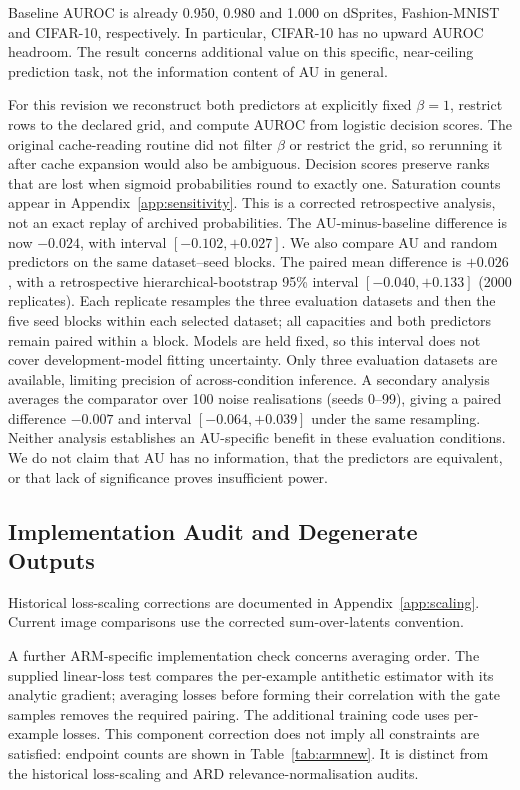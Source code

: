 \documentclass[make,article,submit,pdftex,moreauthors]{Definitions/mdpi}
\begin{document}
Baseline AUROC is already 0.950, 0.980 and 1.000 on dSprites,
Fashion-MNIST and CIFAR-10, respectively. In particular, CIFAR-10 has
no upward AUROC headroom. The result concerns additional value on this
specific, near-ceiling prediction task, not the information content of
AU in general.

For this revision we reconstruct both predictors at explicitly fixed
$\beta=1$, restrict rows to the declared grid, and compute AUROC from
logistic decision scores. The original cache-reading routine did not
filter $\beta$ or restrict the grid, so rerunning it after cache expansion
would also be ambiguous. Decision scores preserve ranks that are lost
when sigmoid probabilities round to exactly one. Saturation counts
appear in Appendix~\ref{app:sensitivity}. This is a corrected retrospective
analysis, not an exact replay of archived probabilities. The
AU-minus-baseline difference is now $-0.024$, with interval
$[-0.102,+0.027]$. We also compare AU and random
predictors on the same dataset--seed blocks.
The paired mean difference is $+0.026$, with a retrospective
hierarchical-bootstrap 95\% interval $[-0.040,+0.133]$ (2000
replicates). Each replicate resamples the three evaluation datasets and
then the five seed blocks within each selected dataset; all capacities
and both predictors remain paired within a block. Models are held fixed,
so this interval does not cover development-model fitting uncertainty.
Only three evaluation datasets are available, limiting precision of
across-condition inference. A secondary analysis averages the comparator
over 100 noise realisations (seeds 0--99), giving a paired difference
$-0.007$ and interval $[-0.064,+0.039]$ under the
same resampling. Neither analysis establishes an AU-specific benefit in
these evaluation conditions. We do not claim that AU has no information,
that the predictors are equivalent, or that lack of significance proves
insufficient power.

\subsection{Implementation Audit and Degenerate Outputs}
Historical loss-scaling corrections are documented in
Appendix~\ref{app:scaling}. Current image comparisons use the corrected
sum-over-latents convention.

A further ARM-specific implementation check concerns averaging order.
The supplied linear-loss test compares the per-example antithetic
estimator with its analytic gradient; averaging losses before forming
their correlation with the gate samples removes the required pairing.
The additional training code uses per-example losses. This component
correction does not imply all constraints are satisfied: endpoint
counts are shown in Table~\ref{tab:armnew}. It is distinct from the
historical loss-scaling and ARD relevance-normalisation audits.
\end{document}
